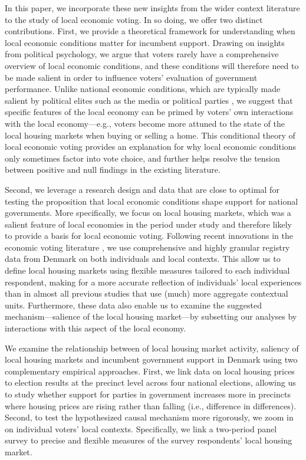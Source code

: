 \documentclass[12pt,a4paper]{article}
\begin{document}
	In this paper, we incorporate these new insights from the wider context literature to the study of local economic voting. In so doing, we offer two distinct contributions. First, we provide a theoretical framework for understanding when local economic conditions matter for incumbent support. Drawing on insights from political psychology, we argue that voters rarely have a comprehensive overview of local economic conditions, and these conditions will therefore need to be made salient in order to influence voters’ evaluation of government performance. Unlike national economic conditions, which are typically made salient by political elites such as the media \citep{hart2013can} or political parties \citep{bisgaard2017partisan}, we suggest that specific features of the local economy can be primed by voters’ own interactions with the local economy—e.g., voters become more attuned to the state of the local housing markets when buying or selling a home. This conditional theory of local economic voting provides an explanation for why local economic conditions only sometimes factor into vote choice, and further helps resolve the tension between positive and null findings in the existing literature.
	
	Second, we leverage a research design and data that are close to optimal for testing the proposition that local economic conditions shape support for national governments. More specifically, we focus on local housing markets, which was a salient feature of local economies in the period under study and therefore likely to provide a basis for local economic voting. Following recent innovations in the economic voting literature \citep{healy2017digging}, we use comprehensive and highly granular registry data from Denmark on both individuals and local contexts. This allow us to define local housing markets using flexible measures tailored to each individual respondent, making for a more accurate reflection of individuals’ local experiences than in almost all previous studies that use (much) more aggregate contextual units. Furthermore, these data also enable us to examine the suggested mechanism—salience of the local housing market—by subsetting our analyses by interactions with this aspect of the local economy.  
	
	We examine the relationship between of local housing market activity, saliency of local housing markets and incumbent government support in Denmark using two complementary empirical approaches. First, we link data on local housing prices to election results at the precinct level across four national elections, allowing us to study whether support for parties in government increases more in precincts where housing prices are rising rather than falling (i.e., difference in differences). Second, to test the hypothesized causal mechanism more rigorously, we zoom in on individual voters' local contexts. Specifically, we link a two-period panel survey to precise and flexible measures of the survey respondents’ local housing market.
	
\end{document}
